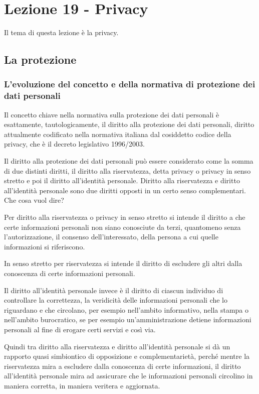 \chapter{Lezione 19 - Privacy}

Il tema di questa lezione è la privacy. 
\section{La protezione}

\subsection{L'evoluzione del concetto e della normativa di protezione dei dati personali}

Il concetto chiave nella normativa sulla protezione dei dati personali è esattamente, tautologicamente, il diritto alla protezione dei dati personali, diritto attualmente codificato nella normativa italiana dal cosiddetto codice della privacy, che è il decreto legislativo 1996/2003. 

Il diritto alla protezione dei dati personali può essere considerato come la somma di due distinti diritti, il diritto alla riservatezza, detta privacy o privacy in senso stretto e poi il diritto all'identità personale. 
Diritto alla riservatezza e diritto all'identità personale sono due diritti opposti in un certo senso complementari. 
Che cosa vuol dire? 

Per diritto alla riservatezza o privacy in senso stretto si intende il diritto a che certe informazioni personali non siano conosciute da terzi, quantomeno senza l'autorizzazione, il consenso dell'interessato, della persona a cui quelle informazioni si riferiscono.  

In senso stretto per riservatezza si intende il diritto di escludere gli altri dalla conoscenza di certe informazioni personali. 

Il diritto all'identità personale invece è il diritto di ciascun individuo di controllare la correttezza, la veridicità delle informazioni personali che lo riguardano e che circolano, per esempio nell'ambito informativo, nella stampa o nell'ambito burocratico, se per esempio un'amministrazione detiene informazioni personali al fine di erogare certi servizi e così via. 

Quindi tra diritto alla riservatezza e diritto all'identità personale si dà un rapporto quasi simbiontico di opposizione e complementarietà, perché mentre la riservatezza mira a escludere dalla conoscenza di certe informazioni, il diritto all'identità personale mira ad assicurare che le informazioni personali circolino in maniera corretta, in maniera veritera e aggiornata. 
 
